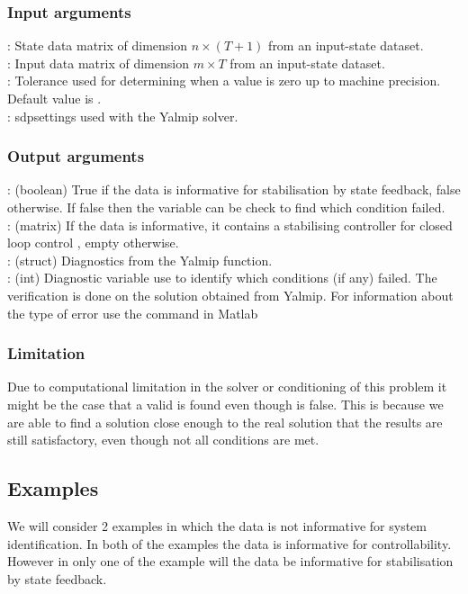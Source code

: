 \subsubsection*{Input arguments}
\textbf{}: State data matrix of dimension $n \times (T+1)$ from an input-state dataset.\\
\textbf{}: Input data matrix of dimension $m \times T$ from an input-state dataset.\\
\textbf{}: Tolerance used for determining when a value is zero up to machine precision. Default value is .\\
\textbf{}: sdpsettings used with the Yalmip solver.

\subsubsection*{Output arguments}
\textbf{}: (boolean) True if the data is informative for stabilisation by state feedback, false otherwise. If false then the  variable can be check to find which condition failed. \\
\textbf{}: (matrix) If the data is informative, it contains a stabilising controller  for closed loop control , empty otherwise.\\
\textbf{}: (struct) Diagnostics from the Yalmip  function. \\
\textbf{}: (int) Diagnostic variable use to identify which conditions (if any) failed. The verification is done on the solution obtained from Yalmip. For information about the type of error use the  command in Matlab

\subsubsection*{Limitation}
Due to computational limitation in the solver or conditioning of this problem it might be the case that a valid  is found even though  is false. This is because we are able to find a solution close enough to the real solution that the results are still satisfactory, even though not all conditions are met. 

\subsection{Examples} \label{ExampleOfSingleSystemHavingPropertyButNotInformative}
We will consider 2 examples in which the data is not informative for system identification. In both of the examples the data is informative for controllability. However in only one of the example will the data be informative for stabilisation by state feedback.

